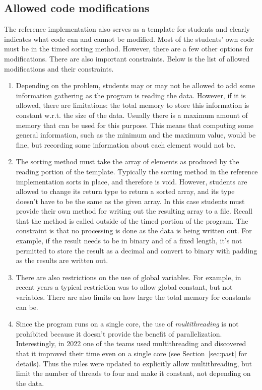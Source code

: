 \documentclass[12pt]{article}
\begin{document}
\subsection{Allowed code modifications}\label{subsec:allowed-features}
The reference implementation also serves as a template for students and clearly indicates what code can and cannot be modified. Most of the students' own code must be in the timed sorting method. However, there are a few other options for modifications. There are also important constraints. Below is the list of allowed modifications and their constraints.
\begin{enumerate}
\item Depending on the problem, students may or may not be allowed to add some information gathering as the program is reading the data. However, if it is allowed,  there are limitations:  the total memory to store this information is constant w.r.t. the size of the data. Usually there is a maximum amount of memory that can be used for this purpose. This means that computing some general information, such as the minimum and the maximum value, would be fine, but recording some information about each element would not be.
\item The sorting method must take the array of elements as produced by the reading portion of the template. Typically the sorting method in the reference implementation sorts in place, and therefore is void. However, students are allowed to change its return type to return a sorted array, and its type doesn't have to be the same as the given array. In this case students must provide their own method for writing out the resulting array to a file. Recall that the method is called outside of the timed portion of the program. The constraint is that no processing is done as the data is being written out. For example, if the result needs to be in binary and of a fixed length, it's not permitted to store the result as a decimal and convert to binary with padding as the results are written out. 
\item  There are also restrictions on the use of global variables. For example, in recent years a typical restriction was to allow global constant, but not variables. There are also limits on how large the total memory for constants can be. 
\item Since the program runs on a single core, the use of \textit{multithreading} is not prohibited because it doesn't provide the benefit of parallelization.  Interestingly, in 2022 one of the teams used multithreading and discovered that it improved their time even on a single core (see Section~\ref{sec:past} for details). Thus the rules were updated to explicitly allow multithreading, but limit the number of threads to four and make it constant, not depending on the data.
\end{enumerate}
\end{document}
